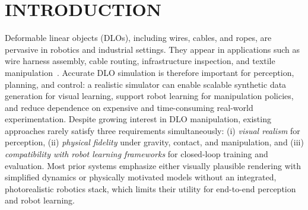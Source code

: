 \documentclass[letterpaper, 10 pt, conference]{ieeeconf}  %
\begin{document}




\section{INTRODUCTION}

Deformable linear objects (DLOs), including wires, cables, and ropes, are pervasive in robotics and industrial settings. They appear in applications such as wire harness assembly, cable routing, infrastructure inspection, and textile manipulation~\cite{intro_survey}. Accurate DLO simulation is therefore important for perception, planning, and control: a realistic simulator can enable scalable synthetic data generation for visual learning, support robot learning for manipulation policies, and reduce dependence on expensive and time-consuming real-world experimentation. Despite growing interest in DLO manipulation, existing approaches rarely satisfy three requirements simultaneously: (i) \emph{visual realism} for perception, (ii) \emph{physical fidelity} under gravity, contact, and manipulation, and (iii) \emph{compatibility with robot learning frameworks} for closed-loop training and evaluation. Most prior systems emphasize either visually plausible rendering with simplified dynamics or physically motivated models without an integrated, photorealistic robotics stack, which limits their utility for end-to-end perception and robot learning.
\end{document}
